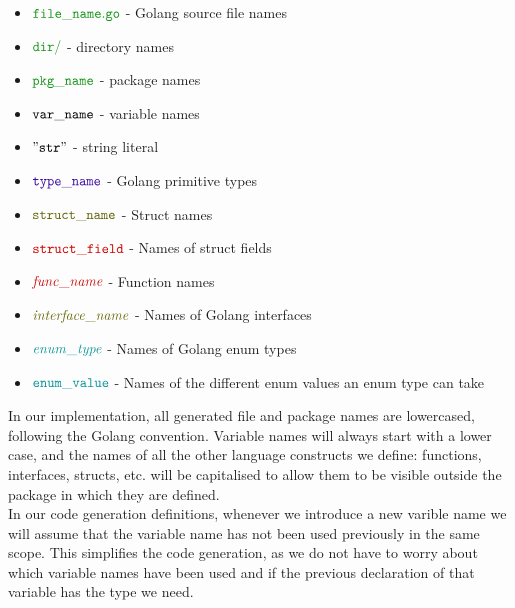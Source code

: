 \documentclass[12pt,twoside]{report}
\begin{document}
\begin{itemize}
    \item $\filename{file\_name}$ - Golang source file names
    \item $\dirname{dir}$ - directory names
    \item $\pkgname{pkg\_name}$ - package names
    \item ${\mathtt{var\_name}}$ - variable names
    \item $\mathtt{"str"}$ - string literal
    \item $\typename{type\_name}$ - Golang primitive types
    \item $\structname{struct\_name}$ - Struct names
    \item $\structfield{struct\_field}$ - Names of struct fields
    \item $\functionname{func\_name}$ - Function names
    \item $\interfacename{interface\_name}$ - Names of Golang interfaces
    \item $\enumtype{enum\_type}$ - Names of Golang enum types
    \item $\enumvalue{enum\_value}$ - Names of the different enum values an enum type can take
\end{itemize}

In our implementation, all generated file and package names are lowercased, following the Golang convention. Variable names will always start with a lower case, and the names of all the other language constructs we define: functions, interfaces, structs, etc. will be capitalised to allow them to be visible outside the package in which they are defined.\\

In our code generation definitions, whenever we introduce a new varible name we will assume that the variable name has not been used previously in the same scope. This simplifies the code generation, as we do not have to worry about which variable names have been used and if the previous declaration of that variable has the type we need.\\

\end{document}

